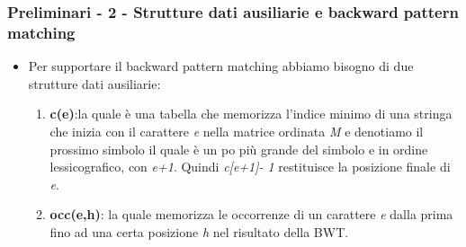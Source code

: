 \documentclass{beamer}
\begin{document}
\begin{frame}
\frametitle{Preliminari - 2 - Strutture dati ausiliarie e backward pattern matching}
\begin{itemize}
	\item Per supportare il backward pattern matching abbiamo bisogno di due strutture dati ausiliarie:\pause
	\begin{enumerate}
		\item \textbf{c(e)}:la quale è una tabella che memorizza l'indice minimo di una stringa che inizia con il carattere \textit{e} nella matrice ordinata \textit{M} e denotiamo il prossimo simbolo il quale è un po più grande del simbolo e  in ordine lessicografico, con \textit{e+1}. Quindi \textit{c[e+1]- 1} restituisce la posizione finale di \textit{e}.\pause
		\item \textbf{occ(e,h)}: la quale memorizza le occorrenze di un carattere \textit{e} dalla prima fino ad una certa posizione \textit{h} nel risultato della BWT. 
	\end{enumerate}
\end{itemize}
\end{frame}
\end{document}
